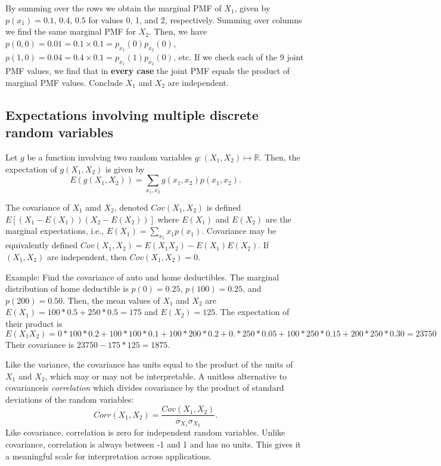 \documentclass[
]{book}
\begin{document}
By summing over the rows we obtain the marginal PMF of \(X_1\), given by \(p(x_1) = 0.1,\, 0.4,\, 0.5\) for values \(0\), 1, and 2, respectively. Summing over columns we find the same marginal PMF for \(X_2\). Then, we have \(p(0,0) = 0.01 = 0.1\times 0.1 = p_{x_1}(0)p_{x_2}(0)\), \(p(1,0) = 0.04 = 0.4\times 0.1 = p_{x_1}(1)p_{x_2}(0)\), etc. If we check each of the 9 joint PMF values, we find that in \textbf{every case} the joint PMF equals the product of marginal PMF values. Conclude \(X_1\) and \(X_2\) are independent.

\hypertarget{expectations-involving-multiple-discrete-random-variables}{%
\subsection{Expectations involving multiple discrete random variables}\label{expectations-involving-multiple-discrete-random-variables}}

Let \(g\) be a function involving two random variables \(g:(X_1,X_2)\mapsto \mathbb{R}\). Then, the expectation of \(g(X_1,X_2)\) is given by
\[E(g(X_1,X_2)) = \sum_{x_1,x_2} g(x_1,x_2)p(x_1,x_2).\]

The covariance of \(X_1\) amd \(X_2\), denoted \(Cov(X_1,X_2)\) is defined \(E[(X_1 - E(X_1))(X_2 - E(X_2))]\) where \(E(X_1)\) and \(E(X_2)\) are the marginal expectations, i.e., \(E(X_1) = \sum_{x_1} x_1 p(x_1)\). Covariance may be equivalently defined \(Cov(X_1, X_2) = E(X_1X_2)-E(X_1)E(X_2)\). If \((X_1,X_2)\) are independent, then \(Cov(X_1,X_2) = 0\).

Example: Find the covariance of auto and home deductibles.
The marginal distribution of home deductible is \(p(0) = 0.25\), \(p(100) = 0.25\), and \(p(200) = 0.50\). Then, the mean values of \(X_1\) and \(X_2\) are \(E(X_1) = 100*0.5 + 250 * 0.5 = 175\) and \(E(X_2) = 125\). The expectation of their product is
\[E(X_1X_2) = 0*100*0.2 + 100*100*0.1 + 100*200*0.2 + 0.*250*0.05 + 100*250*0.15 + 200*250*0.30=23750\]
Their covariance is \(23750-175*125 = 1875\).

Like the variance, the covariance has units equal to the product of the units of \(X_1\) and \(X_2\), which may or may not be interpretable. A unitless alternative to covarianceis \emph{correlation} which divides covariance by the product of standard deviations of the random variables:
\[Corr(X_1, X_2) = \frac{Cov(X_1,X_2)}{\sigma_{X_1}\sigma_{X_2}}.\]
Like covariance, correlation is zero for independent random variables. Unlike covariance, correlation is always between -1 and 1 and has no units. This gives it a meaningful scale for interpretation across applications.
\end{document}
